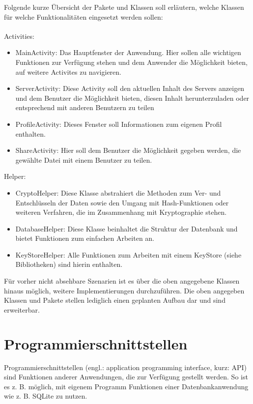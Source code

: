 \documentclass[10pt, a4paper,headsepline,pointednumbers]{scrreprt}
\begin{document}
Folgende kurze Übersicht der Pakete und Klassen soll erläutern, welche Klassen für welche Funktionalitäten eingesetzt werden sollen:\\ \\
Activities:
\begin{itemize}
\item MainActivity: Das Hauptfenster der Anwendung. Hier sollen alle wichtigen Funktionen zur Verfügung stehen und dem Anwender die Möglichkeit bieten, auf weitere Activites zu navigieren.
\item ServerActivity: Diese Activity soll den aktuellen Inhalt des Servers anzeigen und dem Benutzer die Möglichkeit bieten, diesen Inhalt herunterzuladen oder entsprechend mit anderen Benutzern zu teilen
\item ProfileActivity: Dieses Fenster soll Informationen zum eigenen Profil enthalten.
\item ShareActivity: Hier soll dem Benutzer die Möglichkeit gegeben werden, die gewählte Datei mit einem Benutzer zu teilen.
\end{itemize}
Helper:
\begin{itemize}
\item CryptoHelper: Diese Klasse abstrahiert die Methoden zum Ver- und Entschlüsseln der Daten sowie den Umgang mit Hash-Funktionen oder weiteren Verfahren, die im Zusammenhang mit Kryptographie stehen.
\item DatabaseHelper: Diese Klasse beinhaltet die Struktur der Datenbank und bietet Funktionen zum einfachen Arbeiten an.
\item KeyStoreHelper: Alle Funktionen zum Arbeiten mit einem KeyStore (siehe Bibliotheken) sind hierin enthalten.
\end{itemize}
Für vorher nicht absehbare Szenarien ist es über die oben angegebene Klassen hinaus möglich, weitere Implementierungen durchzuführen. Die oben angegeben Klassen und Pakete stellen lediglich einen geplanten Aufbau dar und sind erweiterbar.


\section{Programmierschnittstellen}
Programmierschnittstellen (engl.: application programming interface, kurz: API) sind Funktionen anderer Anwendungen, die zur Verfügung gestellt werden. So ist es z. B. möglich, mit eigenem Programm Funktionen einer Datenbankanwendung wie z. B. SQLite zu nutzen.
\end{document}
